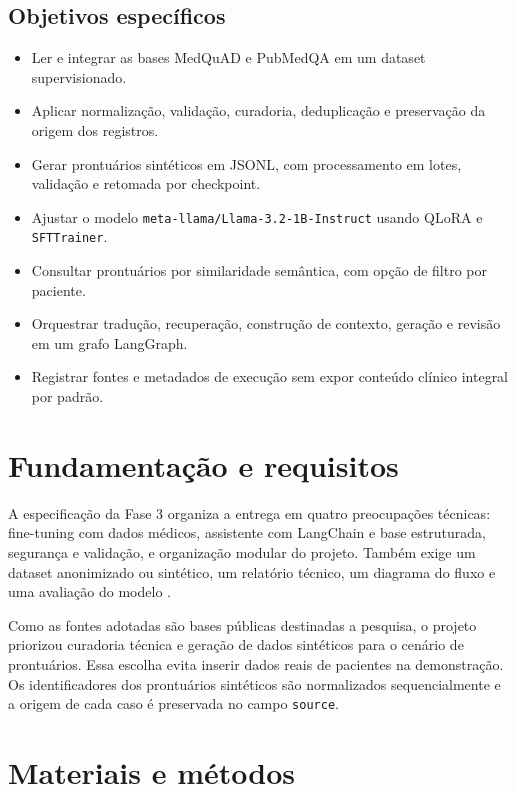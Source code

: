 \documentclass[12pt,a4paper]{article}
\begin{document}
\subsection{Objetivos específicos}
\begin{itemize}
  \item Ler e integrar as bases MedQuAD e PubMedQA em um dataset supervisionado.
  \item Aplicar normalização, validação, curadoria, deduplicação e preservação da origem dos registros.
  \item Gerar prontuários sintéticos em JSONL, com processamento em lotes, validação e retomada por checkpoint.
  \item Ajustar o modelo \texttt{meta-llama/Llama-3.2-1B-Instruct} usando QLoRA e \texttt{SFTTrainer}.
  \item Consultar prontuários por similaridade semântica, com opção de filtro por paciente.
  \item Orquestrar tradução, recuperação, construção de contexto, geração e revisão em um grafo LangGraph.
  \item Registrar fontes e metadados de execução sem expor conteúdo clínico integral por padrão.
\end{itemize}

\section{Fundamentação e requisitos}

A especificação da Fase 3 organiza a entrega em quatro preocupações técnicas: fine-tuning com dados médicos, assistente com LangChain e base estruturada, segurança e validação, e organização modular do projeto. Também exige um dataset anonimizado ou sintético, um relatório técnico, um diagrama do fluxo e uma avaliação do modelo \cite{especificacao}.

Como as fontes adotadas são bases públicas destinadas a pesquisa, o projeto priorizou curadoria técnica e geração de dados sintéticos para o cenário de prontuários. Essa escolha evita inserir dados reais de pacientes na demonstração. Os identificadores dos prontuários sintéticos são normalizados sequencialmente e a origem de cada caso é preservada no campo \texttt{source}.

\section{Materiais e métodos}
\end{document}
